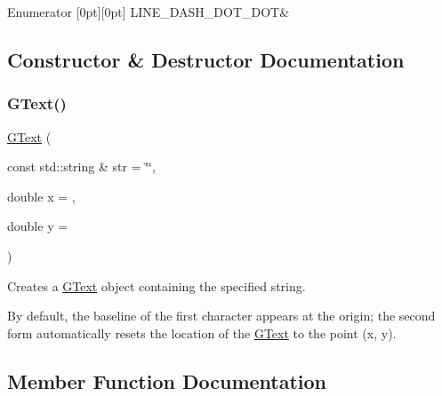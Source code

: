 \begin{DoxyEnumFields}{Enumerator}
[0pt][0pt]{}\mbox{\label{classsgl_1_1GObject_a86e0f5648542856159bb40775c854aa7aabf4053a73eafa7ba2b7e6d664c74c1d}} 
L\+I\+N\+E\+\_\+\+D\+A\+S\+H\+\_\+\+D\+O\+T\+\_\+\+D\+OT&\\
\hline

\end{DoxyEnumFields}


\subsection{Constructor \& Destructor Documentation}
\mbox{\label{classsgl_1_1GText_ad86d52c255aab367ddc6c54baff70846}} 
\subsubsection{\texorpdfstring{G\+Text()}{GText()}}
{\footnotesize\ttfamily \mbox{\hyperlink{classsgl_1_1GText}{G\+Text}} (\begin{DoxyParamCaption}\item[{const std\+::string \&}]{str = {\ttfamily \char`\"{}\char`\"{}},  }\item[{double}]{x = {},  }\item[{double}]{y = {} }\end{DoxyParamCaption})}



Creates a {\ttfamily \mbox{\hyperlink{classsgl_1_1GText}{G\+Text}}} object containing the specified string. 

By default, the baseline of the first character appears at the origin; the second form automatically resets the location of the {\ttfamily \mbox{\hyperlink{classsgl_1_1GText}{G\+Text}}} to the point ({\ttfamily x}, {\ttfamily y}). 

\subsection{Member Function Documentation}
\mbox{\label{classsgl_1_1GObject_abb6a5d7c03e6eaaae97264c4799ce7c3}} 
